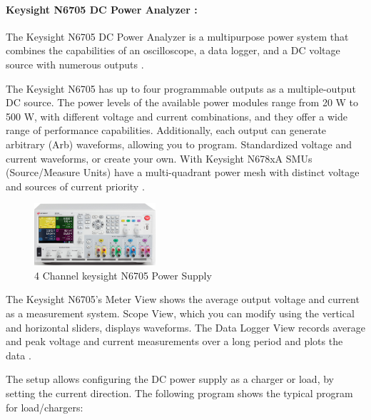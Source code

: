 \paragraph{ Keysight N6705 DC Power Analyzer :}

The Keysight N6705 DC Power Analyzer is a multipurpose power system that combines the capabilities of an oscilloscope, a data logger, and a DC voltage source with numerous outputs \cite{Keysight_N6705_DC_Power_Analyzer}.

The Keysight N6705 has up to four programmable outputs as a multiple-output DC source. The power levels of the available power modules range from 20 W to 500 W, with different voltage and current combinations, and they offer a wide range of performance capabilities. Additionally, each output can generate arbitrary (Arb) waveforms, allowing you to program. Standardized voltage and current waveforms, or create your own. With Keysight N678xA SMUs (Source/Measure Units) have a multi-quadrant power mesh with distinct voltage and sources of current priority \cite{Keysight_N6705_DC_Power_Analyzer}.

\begin{figure}[h]
	\centering
	\includegraphics[width=0.4\textwidth]{Chap06/Figures/keysight_n6705.PNG}
	\caption{4 Channel keysight N6705 Power Supply }
	\label{fig:keysight_n6705}
\end{figure}

The Keysight N6705's Meter View shows the average output voltage and current as a measurement system. Scope View, which you can modify using the vertical and horizontal sliders, displays waveforms. The Data Logger View records average and peak voltage and current measurements over a long period and plots the data \cite{Keysight_N6705_DC_Power_Analyzer}.

The setup allows configuring the DC power supply as a charger or load, by setting the current direction.  The following program shows the typical program for load/chargers:

